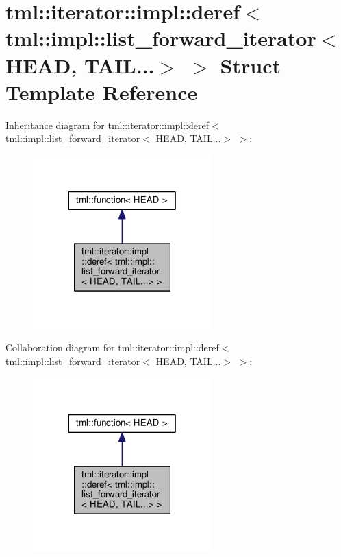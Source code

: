 \hypertarget{structtml_1_1iterator_1_1impl_1_1deref_3_01tml_1_1impl_1_1list__forward__iterator_3_01_h_e_a_d_00_01_t_a_i_l_8_8_8_4_01_4}{\section{tml\+:\+:iterator\+:\+:impl\+:\+:deref$<$ tml\+:\+:impl\+:\+:list\+\_\+forward\+\_\+iterator$<$ H\+E\+A\+D, T\+A\+I\+L...$>$ $>$ Struct Template Reference}
\label{structtml_1_1iterator_1_1impl_1_1deref_3_01tml_1_1impl_1_1list__forward__iterator_3_01_h_e_a_d_00_01_t_a_i_l_8_8_8_4_01_4}
}


Inheritance diagram for tml\+:\+:iterator\+:\+:impl\+:\+:deref$<$ tml\+:\+:impl\+:\+:list\+\_\+forward\+\_\+iterator$<$ H\+E\+A\+D, T\+A\+I\+L...$>$ $>$\+:
\nopagebreak
\begin{figure}[H]
\begin{center}
\leavevmode
\includegraphics[width=196pt]{structtml_1_1iterator_1_1impl_1_1deref_3_01tml_1_1impl_1_1list__forward__iterator_3_01_h_e_a_d_08dc580f07a433acccdcdf3a5cd889ae2}
\end{center}
\end{figure}


Collaboration diagram for tml\+:\+:iterator\+:\+:impl\+:\+:deref$<$ tml\+:\+:impl\+:\+:list\+\_\+forward\+\_\+iterator$<$ H\+E\+A\+D, T\+A\+I\+L...$>$ $>$\+:
\nopagebreak
\begin{figure}[H]
\begin{center}
\leavevmode
\includegraphics[width=196pt]{structtml_1_1iterator_1_1impl_1_1deref_3_01tml_1_1impl_1_1list__forward__iterator_3_01_h_e_a_d_05603006ad5c9646c95605488979c81ff}
\end{center}
\end{figure}
